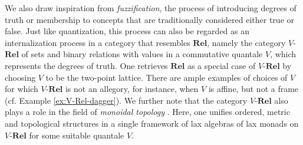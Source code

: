 \documentclass[12pt]{tac}
\theoremstyle{definition}
\theoremstyle{remark}
\newcommand{\<}{\langle}
\renewcommand{\>}{\rangle}
\renewcommand{\:}{\colon}
\begin{document}
We also draw inspiration from \emph{fuzzification}, the process of introducing degrees of truth or membership to concepts that are traditionally considered either true or false. Just like quantization, this process can also be regarded as an internalization process in a category that resembles $\mathbf{Rel}$, namely the category $V$-$\mathbf{Rel}$ of sets and binary relations with values in a commutative quantale $V$, which represents the degrees of truth. One retrieves $\mathbf{Rel}$ as a special case of $V$-$\mathbf{Rel}$ by choosing $V$ to be the two-point lattice. There are ample examples of choices of $V$ for which $V$-$\mathbf{Rel}$ is not an allegory, for instance, when $V$ is affine, but not a frame (cf. Example \ref{ex:V-Rel-dagger}). We further note that the category $V$-$\mathbf{Rel}$ also plays a role in the field of \emph{monoidal topology} \cite{monoidaltopology}. Here, one unifies ordered, metric and topological structures in a single framework of lax algebras of lax monads on $V$-$\mathbf{Rel}$ for some suitable quantale $V$.
\end{document}
